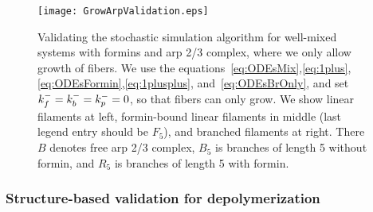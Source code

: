 \documentclass[11pt]{article}
\begin{document}
\begin{figure}
\centering
\texttt{[image: GrowArpValidation.eps]}
\caption{\label{fig:GrowArpValid}Validating the stochastic simulation algorithm for well-mixed systems with formins and arp 2/3 complex, where we only allow growth of fibers. We use the equations\ \eqref{eq:ODEsMix},\eqref{eq:1plus},\eqref{eq:ODEsFormin},\eqref{eq:1plusplus}, and\ \eqref{eq:ODEsBrOnly}, and set $k_f^-=k_b^-=k_p^-=0$, so that fibers can only grow. We show linear filaments at left, formin-bound linear filaments in middle (last legend entry should be $F_5$), and branched filaments at right. There $B$ denotes free arp 2/3 complex, $B_5$ is branches of length 5 without formin, and $R_5$ is branches of length 5 with formin.  }
\end{figure}


\subsubsection{Structure-based validation for depolymerization}



\end{document}
